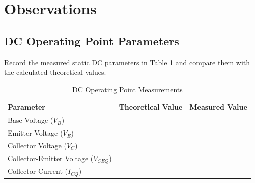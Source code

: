 \section{Observations}
\subsection{DC Operating Point Parameters}
Record the measured static DC parameters in Table \ref{tab:dc_obs} and compare them with the calculated theoretical values.

\begin{table}[h!]
	\centering
	\begin{tabular}{lll}
		\toprule
		\textbf{Parameter} & \textbf{Theoretical Value} & \textbf{Measured Value} \\
		\midrule
		Base Voltage ($V_B$) &  & \\
		Emitter Voltage ($V_E$) & & \\
		Collector Voltage ($V_C$) &  & \\
		Collector-Emitter Voltage ($V_{CEQ}$) & &  \\
		Collector Current ($I_{CQ}$) &  &  \\
		\bottomrule
	\end{tabular}
	\caption{DC Operating Point Measurements}
	\label{tab:dc_obs}
\end{table}

